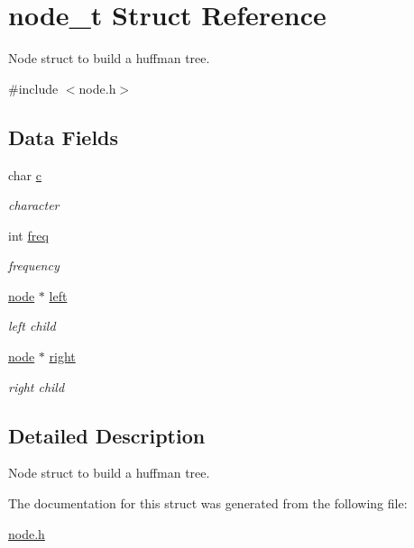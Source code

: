 \hypertarget{structnode__t}{}\section{node\+\_\+t Struct Reference}
\label{structnode__t}


Node struct to build a huffman tree.  




{\ttfamily \#include $<$node.\+h$>$}

\subsection*{Data Fields}
\begin{DoxyCompactItemize}
\item 
\hypertarget{structnode__t_a7f633b088a3b91fb5db93deb4523ea1a}{}char \hyperlink{structnode__t_a7f633b088a3b91fb5db93deb4523ea1a}{c}\label{structnode__t_a7f633b088a3b91fb5db93deb4523ea1a}

\begin{DoxyCompactList}\small\item\em character \end{DoxyCompactList}\item 
\hypertarget{structnode__t_a9e42b84da748936e09ca0bb534f21cbc}{}int \hyperlink{structnode__t_a9e42b84da748936e09ca0bb534f21cbc}{freq}\label{structnode__t_a9e42b84da748936e09ca0bb534f21cbc}

\begin{DoxyCompactList}\small\item\em frequency \end{DoxyCompactList}\item 
\hypertarget{structnode__t_a4e53ca4e5ec812e9aa5bbffd00daaf34}{}\hyperlink{structnode__t}{node} $\ast$ \hyperlink{structnode__t_a4e53ca4e5ec812e9aa5bbffd00daaf34}{left}\label{structnode__t_a4e53ca4e5ec812e9aa5bbffd00daaf34}

\begin{DoxyCompactList}\small\item\em left child \end{DoxyCompactList}\item 
\hypertarget{structnode__t_aa66c42107529e61f602aa0010b286ecd}{}\hyperlink{structnode__t}{node} $\ast$ \hyperlink{structnode__t_aa66c42107529e61f602aa0010b286ecd}{right}\label{structnode__t_aa66c42107529e61f602aa0010b286ecd}

\begin{DoxyCompactList}\small\item\em right child \end{DoxyCompactList}\end{DoxyCompactItemize}


\subsection{Detailed Description}
Node struct to build a huffman tree. 

The documentation for this struct was generated from the following file\+:\begin{DoxyCompactItemize}
\item 
\hyperlink{node_8h}{node.\+h}\end{DoxyCompactItemize}
